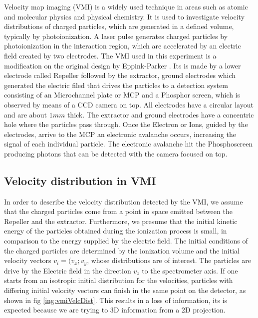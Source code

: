 Velocity map imaging (VMI) is a widely used technique in areas such as atomic and molecular physics and physical chemistry. It is used to investigate velocity distributions of charged particles, which are generated in a defined volume, typically by photoionization.
A laser pulse generates charged particles by photoionization in the interaction region, which are accelerated by an electric field created by two electrodes.
The VMI used in this experiment is a modification on the original design by Eppink-Parker \cite{eppink_velocity_1997}. Its is made by a lower  electrode called Repeller followed by the extractor, ground electrodes which generated the electric filed that drives the particles to a detection system consisting of an Microchannel plate or MCP  and a Phosphor screen, which is observed by means of a CCD camera on top.  All electrodes have a circular layout and are about $1 mm$ thick.  The extractor and ground electrodes have a concentric hole where the particles pass through.
Once the Electron or Ions, guided by the electrodes, arrive to the MCP an electronic avalanche occurs, increasing the signal of each individual particle. The electronic avalanche hit the Phosphoscreen producing photons that can be detected with the camera focused on top.

\subsection{Velocity distribution in VMI}

In order to describe the velocity distribution detected by the VMI, we assume that the charged particles come from a point in space emitted between the Repeller and the extractor. Furthermore, we presume that the initial kinetic energy of the particles obtained during the ionization process is small, in comparison to the energy supplied by the electric field.
The initial conditions of the charged particles are determined by the ionization volume and the initial velocity vectors $v_{i} = (v_{x};v_{y}$, whose distributions are of interest. The particles are drive by the Electric field in the direction $v_{z}$ to the spectrometer axis.
If one starts from an isotropic initial distribution for the velocities, particles with differing initial velocity vectors can finish in the same point on the detector, as shown in fig \ref{ing:vmiVelcDist}. This results in a loss of information, its is expected because we are trying to 3D information from a 2D projection.

